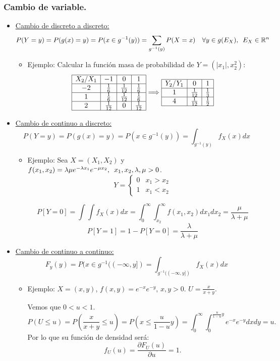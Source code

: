 \documentclass[a4paper, 11pt]{article}
\newcommand{\R}[1][]{\mathbb{R}^{#1}}
\begin{document}
\subsubsection*{Cambio de variable.}
\begin{itemize}
\item \underline{Cambio de discreto a discreto:}
\[
P(Y=y)=P(g(x)=y)=P(x\in g^{-1}(y))=\sum_{g^{-1}(y)}P(X=x) \quad \forall y\in g(E_X), \enskip E_X\in \R[n]
\]
\begin{itemize}
\item Ejemplo: Calcular la función masa de probabilidad de $Y=(|x_1|, x_2^2)$:
\[\begin{array}{|c|c|c|c|}
\hline
X_2/X_1 & -1 & 0 & 1 \\ 
\hline
-2 & \frac{1}{6} & \frac{1}{12} & \frac{1}{6} \\ 
\hline
1 & \frac{1}{6} & \frac{1}{12} & \frac{1}{6} \\ 
\hline
2 & \frac{1}{12} & 0 & \frac{1}{12} \\
\hline
\end{array} \Longrightarrow \begin{array}{|c|c|c|}
\hline
Y_2/Y_1 & 0 & 1 \\
\hline
1 & \frac{1}{12} & \frac{1}{3} \\
\hline
4 & \frac{1}{12} & \frac{1}{2} \\
\hline
\end{array}
\]

\end{itemize}
\item \underline{Cambio de continuo a discreto:}
\[
P(Y=y)=P(g(x)=y)=P(x\in g^{-1}(y))=\int_{g^{-1}(y)}f_X(x)dx
\]

\begin{itemize}
\item Ejemplo: Sea $X=(X_1, X_2)$ y $f(x_1,x_2)=\lambda\mu e^{-\lambda x_1}e^{-\mu x_2}, \enskip x_1,x_2,\lambda,\mu>0$.
\[
Y = \left\{\begin{array}{cc}
0 & x_1 > x_2\\
1 & x_1 < x_2
\end{array}
\right.
\]

\[
P[Y=0]=\int\int f_X(x)dx=\int_0^\infty\int_{x_2}^\infty f(x_1,x_2)dx_1dx_2 = \frac{\mu}{\lambda+\mu}
\]
\[
P[Y=1]=1-P[Y=0] = \frac{\lambda}{\lambda+\mu}
\]
\end{itemize}

\item \underline{Cambio de continuo a continuo:}
\[
F_y(y)=P(x\in g^{-1}((-\infty,y])=\int_{g^{-1}((-\infty,y])}f_X(x)dx
\]

\begin{itemize}
\item Ejemplo: $X=(x,y)$, $f(x,y)=e^{-x}e^{-y}$, $x,y>0$. $U=\frac{x}{x+y}$.

Vemos que $0<u<1$.
\[
P(U\leq u) = P\left(\frac{x}{x+y}\leq u\right)=P\left(x\leq \frac{u}{1-u}y\right)=\int_0^\infty\int_0^{\frac{u}{1-u}y}e^{-x}e^{-y}dxdy=u.
\]
Por lo que su función de densidad será:
\[
f_U(u)=\frac{\partial F_U(u)}{\partial u } = 1.
\]
\end{itemize}
\end{itemize}
\end{document}
